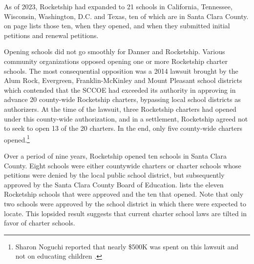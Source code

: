 As of 2023, Rocketship had expanded to 21 schools in California, Tennessee, Wisconsin, Washington, D.C. and Texas, ten of which are in Santa Clara County.  on page \pageref{tab:RocketshipSchools} lists those ten, when they opened, and when they submitted initial petitions and renewal petitions.

Opening schools did not go smoothly for Danner and Rocketship. Various community organizations opposed opening one or more Rocketship charter schools. The most consequential opposition was a 2014 lawsuit brought by the Alum Rock, Evergreen, Franklin-McKinley and Mount Pleasant school districts which contended that the SCCOE had exceeded its authority in approving in advance 20 county-wide Rocketship charters, bypassing local school districts as authorizers. At the time of the lawsuit, three Rocketship charters had opened under this county-wide authorization, and in a settlement, Rocketship agreed not to seek to open 13 of the 20 charters. In the end, only five county-wide charters opened.\footnote{Sharon Noguchi reported that nearly \$500K was spent on this lawsuit and not on educating children \parencite{Noguchi2015}.}

Over a period of nine years, Rocketship opened ten schools in Santa Clara County. Eight schools were either countywide charters or charter schools whose petitions were denied by the local public school district, but subsequently approved by the Santa Clara County Board of Education.  lists the eleven Rocketship schools that were approved and the ten that opened. Note that only two schools were approved by the school district in which there were expected to locate. This lopsided result suggests that current charter school laws are tilted in favor of charter schools.

